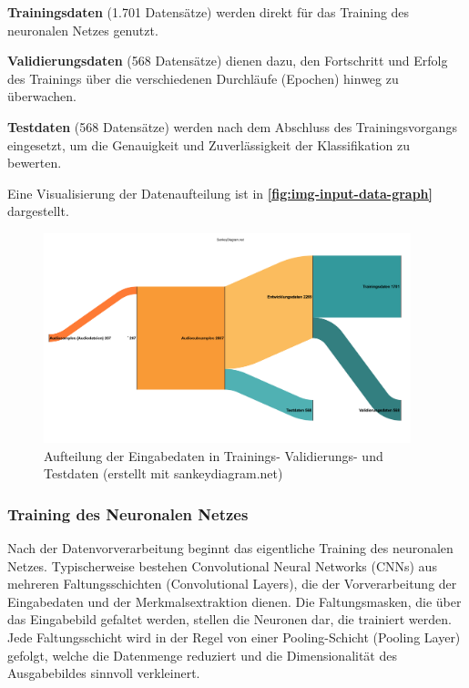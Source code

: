 \textbf{Trainingsdaten} (1.701 Datensätze) werden direkt für das Training des neuronalen Netzes genutzt.

\textbf{Validierungsdaten} (568 Datensätze) dienen dazu, den Fortschritt und Erfolg des Trainings über die verschiedenen Durchläufe (Epochen) hinweg zu überwachen.

\textbf{Testdaten} (568 Datensätze) werden nach dem Abschluss des Trainingsvorgangs eingesetzt, um die Genauigkeit und Zuverlässigkeit der Klassifikation zu bewerten.

Eine Visualisierung der Datenaufteilung ist in \textbf{\autoref{fig:img-input-data-graph}} dargestellt.

\begin{figure}[h!]
\centering
\includegraphics[width=0.95\textwidth]{images/08_durchfuehrung/nn/input-data-graph.png}
\caption{Aufteilung der Eingabedaten in Trainings- Validierungs- und Testdaten (erstellt mit sankeydiagram.net)}
\label{fig:img-input-data-graph}
\end{figure}

\subsubsection{Training des Neuronalen Netzes}

Nach der Datenvorverarbeitung beginnt das eigentliche Training des neuronalen Netzes. Typischerweise bestehen Convolutional Neural Networks (CNNs) aus mehreren Faltungsschichten (Convolutional Layers), die der Vorverarbeitung der Eingabedaten und der Merkmalsextraktion dienen. Die Faltungsmasken, die über das Eingabebild gefaltet werden, stellen die Neuronen dar, die trainiert werden. Jede Faltungsschicht wird in der Regel von einer Pooling-Schicht (Pooling Layer) gefolgt, welche die Datenmenge reduziert und die Dimensionalität des Ausgabebildes sinnvoll verkleinert. \cite{how-cnn-work}


